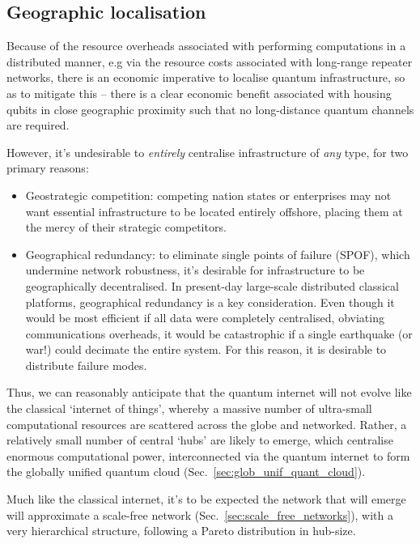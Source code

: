 \subsection{Geographic localisation}\label{sec:geo_loc}

Because of the resource overheads associated with performing computations in a distributed manner, e.g via the resource costs associated with long-range repeater networks, there is an economic imperative to localise quantum infrastructure, so as to mitigate this -- there is a clear economic benefit associated with housing qubits in close geographic proximity such that no long-distance quantum channels are required.

However, it's undesirable to \textit{entirely} centralise infrastructure of \textit{any} type, for two primary reasons:
\begin{itemize}
	\item Geostrategic competition: competing nation states or enterprises may not want essential infrastructure to be located entirely offshore, placing them at the mercy of their strategic competitors.
	\item Geographical redundancy: to eliminate single points of failure (SPOF), which undermine network robustness, it's desirable for infrastructure to be geographically decentralised. In present-day large-scale distributed classical platforms, geographical redundancy is a key consideration. Even though it would be most efficient if all data were completely centralised, obviating communications overheads, it would be catastrophic if a single earthquake (or war!) could decimate the entire system. For this reason, it is desirable to distribute failure modes.
\end{itemize}

Thus, we can reasonably anticipate that the quantum internet will not evolve like the classical `internet of things', whereby a massive number of ultra-small computational resources are scattered across the globe and networked. Rather, a relatively small number of central `hubs' are likely to emerge, which centralise enormous computational power, interconnected via the quantum internet to form the globally unified quantum cloud (Sec.~\ref{sec:glob_unif_quant_cloud}).

Much like the classical internet, it's to be expected the network that will emerge will approximate a scale-free network (Sec.~\ref{sec:scale_free_networks}), with a very hierarchical structure, following a Pareto distribution in hub-size.

